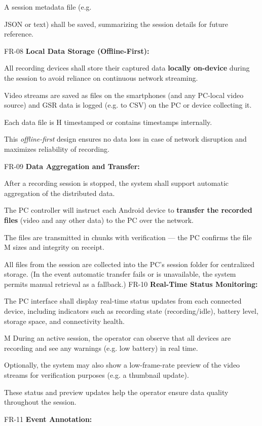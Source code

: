 A session metadata file (e.g.

JSON or text) shall be saved, summarizing the session details for future reference.

FR-08 \textbf{Local Data Storage (Offline-First):}

All recording devices shall store their captured data \textbf{locally on-device}
 during the session to avoid reliance on continuous network streaming.

Video streams are saved as files on the smartphones (and any PC-local video source)
and GSR data is logged (e.g.  to CSV) on the PC or device collecting it.

Each data file is H timestamped or contains timestamps internally.

This \textit{offline-first} design ensures no data loss in case of network disruption
and maximizes reliability of recording.

FR-09 \textbf{Data Aggregation and Transfer:}

After a recording session is stopped, the system shall support automatic aggregation
of the distributed data.

The PC controller will instruct each Android device to \textbf{transfer the recorded
files}
 (video and any other data) to the PC over the network.

The files are transmitted in chunks with verification --- the PC confirms the file M
sizes and integrity on receipt.

All files from the session are collected into the PC's session folder for centralized
storage.  (In the event automatic transfer fails or is unavailable, the system
permits manual retrieval as a fallback.) FR-10 \textbf{Real-Time Status Monitoring:}

The PC interface shall display real-time status updates from each connected device,
including indicators such as recording state (recording/idle), battery level, storage
space, and connectivity health.

M During an active session, the operator can observe that all devices are recording
and see any warnings (e.g.  low battery) in real time.

Optionally, the system may also show a low-frame-rate preview of the video streams
for verification purposes (e.g.  a thumbnail update).

These status and preview updates help the operator ensure data quality throughout the
session.

FR-11 \textbf{Event Annotation:}

